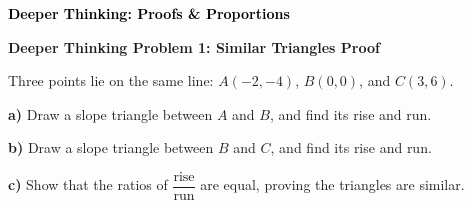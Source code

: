 \documentclass[12pt, letterpaper, fleqn]{article}
\begin{document}
\newpage

\begin{tcolorbox}[colback=customteal!20]
\large\textcolor{black}{\textbf{Deeper Thinking: Proofs \& Proportions}}
\end{tcolorbox}

\vspace{3mm}

\begin{tcolorbox}[colback=white!15, colframe=black, boxrule=1.5pt, arc=4mm, left=6mm, right=6mm, top=5mm, bottom=5mm]

\textbf{Deeper Thinking Problem 1: Similar Triangles Proof}

\medskip

\noindent
Three points lie on the same line: $A(-2, -4)$, $B(0, 0)$, and $C(3, 6)$.

\vspace{5mm}

\noindent
\textbf{a)} Draw a slope triangle between $A$ and $B$, and find its rise and run.

\vspace{2.5cm}

\noindent
\textbf{b)} Draw a slope triangle between $B$ and $C$, and find its rise and run.

\vspace{2.5cm}

\noindent
\textbf{c)} Show that the ratios of $\dfrac{\text{rise}}{\text{run}}$ are equal, proving the triangles are similar.

\vspace{2cm}

\end{tcolorbox}
\end{document}

